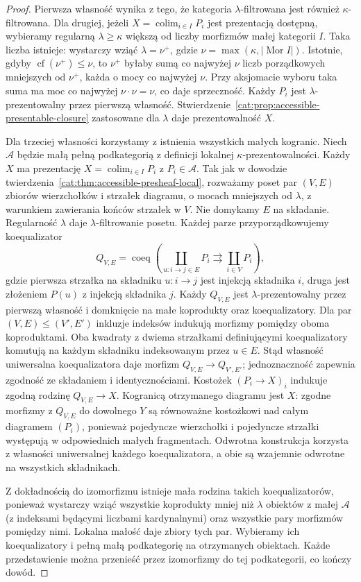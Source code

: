 \begin{proof}
Pierwsza własność wynika z tego, że kategoria $\lambda$-filtrowana jest również $\kappa$-filtrowana. Dla drugiej, jeżeli $X=\operatorname{colim}_{i\in I}P_i$ jest prezentacją dostępną, wybieramy regularną $\lambda\geq\kappa$ większą od liczby morfizmów małej kategorii $I$. Taka liczba istnieje: wystarczy wziąć $\lambda=\nu^+$, gdzie $\nu=\max(\kappa,|\operatorname{Mor}I|)$. Istotnie, gdyby $\operatorname{cf}(\nu^+)\leq\nu$, to $\nu^+$ byłaby sumą co najwyżej $\nu$ liczb porządkowych mniejszych od $\nu^+$, każda o mocy co najwyżej $\nu$. Przy aksjomacie wyboru taka suma ma moc co najwyżej $\nu\cdot\nu=\nu$, co daje sprzeczność. Każdy $P_i$ jest $\lambda$-prezentowalny przez pierwszą własność. Stwierdzenie~\ref{cat:prop:accessible-presentable-closure} zastosowane dla $\lambda$ daje prezentowalność $X$.

Dla trzeciej własności korzystamy z istnienia wszystkich małych kogranic. Niech $\mathcal A$ będzie małą pełną podkategorią z definicji lokalnej $\kappa$-prezentowalności. Każdy $X$ ma prezentację $X=\operatorname{colim}_{i\in I}P_i$ z $P_i\in\mathcal A$. Tak jak w dowodzie twierdzenia~\ref{cat:thm:accessible-presheaf-local}, rozważamy poset par $(V,E)$ zbiorów wierzchołków i strzałek diagramu, o mocach mniejszych od $\lambda$, z warunkiem zawierania końców strzałek w $V$. Nie domykamy $E$ na składanie. Regularność $\lambda$ daje $\lambda$-filtrowanie posetu. Każdej parze przyporządkowujemy koequalizator
\[
 Q_{V,E}=\operatorname{coeq}\left(
   \coprod_{u:i\to j\in E}P_i
    \rightrightarrows \coprod_{i\in V}P_i\right),
\]
gdzie pierwsza strzałka na składniku $u:i\to j$ jest injekcją składnika $i$, druga jest złożeniem $P(u)$ z injekcją składnika $j$. Każdy $Q_{V,E}$ jest $\lambda$-prezentowalny przez pierwszą własność i domknięcie na małe koprodukty oraz koequalizatory. Dla par $(V,E)\leq(V',E')$ inkluzje indeksów indukują morfizmy pomiędzy oboma koproduktami. Oba kwadraty z dwiema strzałkami definiującymi koequalizatory komutują na każdym składniku indeksowanym przez $u\in E$. Stąd własność uniwersalna koequalizatora daje morfizm $Q_{V,E}\to Q_{V',E'}$; jednoznaczność zapewnia zgodność ze składaniem i identycznościami. Kostożek $(P_i\to X)_i$ indukuje zgodną rodzinę $Q_{V,E}\to X$. Kogranicą otrzymanego diagramu jest $X$: zgodne morfizmy z $Q_{V,E}$ do dowolnego $Y$ są równoważne kostożkowi nad całym diagramem $(P_i)$, ponieważ pojedyncze wierzchołki i pojedyncze strzałki występują w odpowiednich małych fragmentach. Odwrotna konstrukcja korzysta z własności uniwersalnej każdego koequalizatora, a obie są wzajemnie odwrotne na wszystkich składnikach.

Z dokładnością do izomorfizmu istnieje mała rodzina takich koequalizatorów, ponieważ wystarczy wziąć wszystkie koprodukty mniej niż $\lambda$ obiektów z małej $\mathcal A$ (z indeksami będącymi liczbami kardynalnymi) oraz wszystkie pary morfizmów pomiędzy nimi. Lokalna małość daje zbiory tych par. Wybieramy ich koequalizatory i pełną małą podkategorię na otrzymanych obiektach. Każde przedstawienie można przenieść przez izomorfizmy do tej podkategorii, co kończy dowód.
\end{proof}

